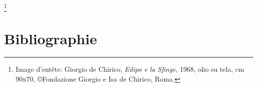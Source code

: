 \documentclass[12pt,fleqn]{book} %
\newcommand\blfootnote[1]{%
  \begingroup
  \renewcommand\thefootnote{}\footnote{#1}%
  \addtocounter{footnote}{-1}%
  \endgroup
}
\begin{document}

\cleardoublepage




\pagestyle{empty} %

\tableofcontents %
\blfootnote{Image d'entête: Giorgio de Chirico, \emph{Edipo e la Sfinge}, 1968, olio su tela, cm 90x70, \copyright Fondazione Giorgio e Isa de Chirico, Roma.}


\cleardoublepage %

\pagestyle{fancy} %

\clearpage





\chapter*{Bibliographie}

\begin{refcontext}[sorting=nyt]
\printbibliography[heading=bibempty]
\end{refcontext}

\clearpage \ifodd\value{page}\hbox{}\newpage\fi %
\pagestyle{empty} %

\end{document}
